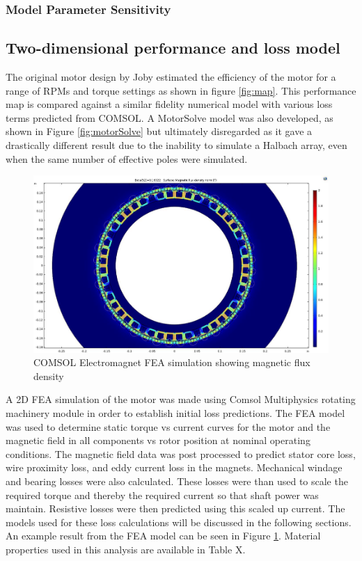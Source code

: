 \documentclass[]{aiaa-tc}%
\begin{document}
\subsubsection{Model Parameter Sensitivity}



\subsection{Two-dimensional performance and loss model}

The original motor design by Joby \cite{Dubois2016} estimated the efficiency of the motor for a range of RPMs and torque settings as shown in figure \ref{fig:map}. This performance map is compared against a similar fidelity numerical model with various loss terms predicted from COMSOL. A MotorSolve model was also developed, as shown in Figure \ref{fig:motorSolve} but ultimately disregarded as it gave a drastically different result due to the inability to simulate a Halbach array, even when the same number of effective poles were simulated.

\begin{figure}[!htb]%
	\centering
	\includegraphics[width=1.0\textwidth]{figures/COMSOL_EM.png}
	\caption{COMSOL Electromagnet FEA simulation showing magnetic flux density}
	\label{fig:COMSOL_EM}
\end{figure}


A 2D FEA simulation of the motor was made using Comsol Multiphysics rotating machinery module in order to establish initial loss predictions. The FEA model was used to determine static torque vs current curves for the motor and the magnetic field in all components vs rotor position at nominal operating conditions. The magnetic field data was post processed to predict stator core loss, wire proximity loss, and eddy current loss in the magnets. Mechanical windage and bearing losses were also calculated. These losses were than used to scale the required torque and thereby the required current so that shaft power was maintain. Resistive losses were then predicted using this scaled up current. The models used for these loss calculations will be discussed in the following sections. An example result from the FEA model can be seen in Figure \ref{fig:COMSOL_EM}. Material properties used in this analysis are available in Table X.
\end{document}

